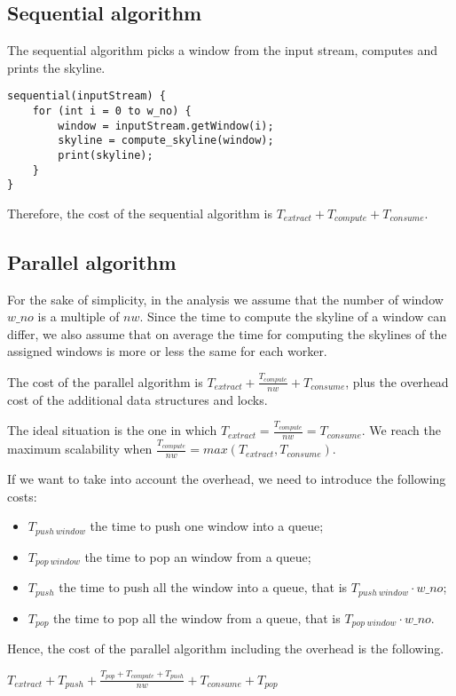 \subsection{Sequential algorithm}
The sequential algorithm picks a window from the input stream, computes and prints the skyline.

\begin{verbatim}
sequential(inputStream) {
    for (int i = 0 to w_no) {
        window = inputStream.getWindow(i);
        skyline = compute_skyline(window);
        print(skyline);
    }
}
\end{verbatim}

\noindent
Therefore, the cost of the sequential algorithm is $T_{extract} +  T_{compute} + T_{consume}$.


\subsection{Parallel algorithm}
For the sake of simplicity, in the analysis we assume that the number of window $w\_no$ is a multiple of $nw$. Since the time to compute the skyline of a window can differ, we also assume that on average the time for computing the skylines of the assigned windows is more or less the same for each worker.

\bigskip\noindent
The cost of the parallel algorithm is $T_{extract} +  \frac{T_{compute}}{nw} + T_{consume}$, plus the overhead cost of the additional data structures and locks.

\bigskip\noindent
The ideal situation is the one in which $T_{extract} = \frac{T_{compute}}{nw} = T_{consume}$.
We reach the maximum scalability when $\frac{T_{compute}}{nw} = max(T_{extract}, T_{consume})$.

\bigskip\noindent
If we want to take into account the overhead, we need to introduce the following costs:
\begin{itemize}
    \item $T_{push\ window}$ the time to push one window into a queue;
    \item $T_{pop\ window}$ the time to pop an window from a queue;
    \item $T_{push}$ the time to push all the window into a queue, that is $T_{push\ window} \cdot w\_no$;
    \item $T_{pop}$ the time to pop all the window from a queue, that is $T_{pop\ window} \cdot w\_no$.
\end{itemize}

\noindent
Hence, the cost of the parallel algorithm including the overhead is the following.
\begin{center}
    $T_{extract} + T_{push} +
    \frac{T_{pop} + T_{compute} + T_{push}}{nw} +
    T_{consume} + T_{pop}$
\end{center}

